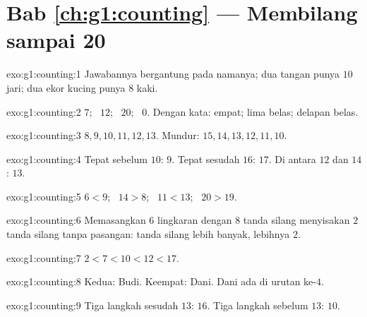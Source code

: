 \section*{Bab \ref{ch:g1:counting} --- Membilang sampai 20}

\begin{solution}{exo:g1:counting:1}
Jawabannya bergantung pada namanya; dua tangan punya $10$ jari; dua
ekor kucing punya $8$ kaki.
\end{solution}

\begin{solution}{exo:g1:counting:2}
$7$; \ $12$; \ $20$; \ $0$. Dengan kata: empat; lima belas; delapan belas.
\end{solution}

\begin{solution}{exo:g1:counting:3}
$8, 9, 10, 11, 12, 13$. Mundur: $15, 14, 13, 12, 11, 10$.
\end{solution}

\begin{solution}{exo:g1:counting:4}
Tepat sebelum $10$: $9$. Tepat sesudah $16$: $17$. Di antara $12$ dan
$14$: $13$.
\end{solution}

\begin{solution}{exo:g1:counting:5}
$6 < 9$; \ $14 > 8$; \ $11 < 13$; \ $20 > 19$.
\end{solution}

\begin{solution}{exo:g1:counting:6}
Memasangkan $6$ lingkaran dengan $8$ tanda silang menyisakan $2$ tanda
silang tanpa pasangan: tanda silang lebih banyak, lebihnya $2$.
\end{solution}

\begin{solution}{exo:g1:counting:7}
$2 < 7 < 10 < 12 < 17$.
\end{solution}

\begin{solution}{exo:g1:counting:8}
Kedua: Budi. Keempat: Dani. Dani ada di urutan ke-$4$.
\end{solution}

\begin{solution}{exo:g1:counting:9}
Tiga langkah sesudah $13$: $16$. Tiga langkah sebelum $13$: $10$.

\end{solution}
